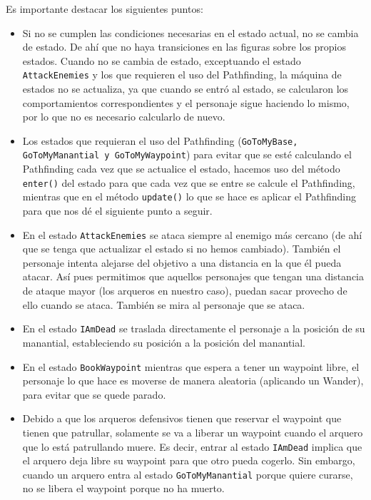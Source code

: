 \newpage
Es importante destacar los siguientes puntos:
\begin{itemize}
 \item Si no se cumplen las condiciones necesarias en el estado actual, no se cambia de estado. De ahí que no haya transiciones en las figuras sobre los propios estados. Cuando no se cambia de estado, exceptuando el estado \texttt{AttackEnemies} y los que requieren el uso del Pathfinding, la máquina de estados no se actualiza, ya que cuando se entró al estado, se calcularon los comportamientos correspondientes y el personaje sigue haciendo lo mismo, por lo que no es necesario calcularlo de nuevo.
 
 \item Los estados que requieran el uso del Pathfinding (\texttt{GoToMyBase, GoToMyManantial y GoToMyWaypoint}) para evitar que se esté calculando el Pathfinding cada vez que se actualice el estado, hacemos uso del método \texttt{enter()} del estado para que cada vez que se entre se calcule el Pathfinding, mientras que en el método \texttt{update()} lo que se hace es aplicar el Pathfinding para que nos dé el siguiente punto a seguir.
 
 \item En el estado \texttt{AttackEnemies} se ataca siempre al enemigo más cercano (de ahí que se tenga que actualizar el estado si no hemos cambiado). También el personaje intenta alejarse del objetivo a una distancia en la que él pueda atacar. Así pues permitimos que aquellos personajes que tengan una distancia de ataque mayor (los arqueros en nuestro caso), puedan sacar provecho de ello cuando se ataca. También se mira al personaje que se ataca.
 
 \item En el estado \texttt{IAmDead} se traslada directamente el personaje a la posición de su manantial, estableciendo su posición a la posición del manantial.
 
 \item En el estado \texttt{BookWaypoint} mientras que espera a tener un waypoint libre, el personaje lo que hace es moverse de manera aleatoria (aplicando un Wander), para evitar que se quede parado.
 
 \item Debido a que los arqueros defensivos tienen que reservar el waypoint que tienen que patrullar, solamente se va a liberar un waypoint cuando el arquero que lo está patrullando muere. Es decir, entrar al estado \texttt{IAmDead} implica que el arquero deja libre su waypoint para que otro pueda cogerlo. Sin embargo, cuando un arquero entra al estado \texttt{GoToMyManantial} porque quiere curarse, no se libera el waypoint porque no ha muerto. 
 

\end{itemize}
